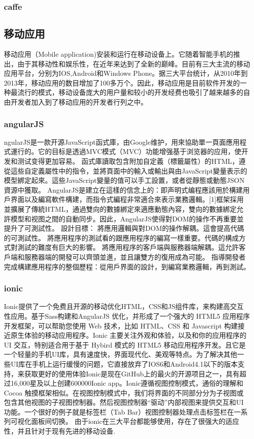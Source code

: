 \subsubsection{caffe}



\subsection{移动应用}

移动应用（Mobile application)安装和运行在移动设备上。它随着智能手机的推出，由于其移动性和娱乐性，在近年来达到了全新的巅峰。目前有三大主流的移动应用平台，分别为IOS,Android和Windows Phone。据三大平台统计，从2010年到2013年，移动应用的数目增加了100多万个。因此，移动应用是目前软件开发的一种最流行的模式，移动设备庞大的用户量和较小的开发经费也吸引了越来越多的自由开发者加入到了移动应用的开发者行列之中。
\subsubsection{angularJS}
ngularJS是一款开源JavaScript函式庫，由Google维护，用來協助單一頁面應用程式運行的。它的目标是透過MVC模式（MVC）功能增强基于浏览器的应用，使开发和测试变得更加容易。
函式庫讀取包含附加自定義（標籤屬性）的HTML，遵從這些自定義屬性中的指令，並將頁面中的輸入或輸出與由JavaScript變量表示的模型綁定起來。這些JavaScript變量的值可以手工設置，或者從靜態或動態JSON資源中獲取。
AngularJS是建立在這樣的信念上的：即声明式编程應該用於構建用戶界面以及編寫軟件構建，而指令式編程非常適合來表示業務邏輯。[1]框架採用並擴展了傳統HTML，通過雙向的數據綁定來適應動態內容，雙向的數據綁定允許模型和视图之間的自動同步。因此，AngularJS使得對DOM的操作不再重要並提升了可測試性。
設計目標：
將應用邏輯與對DOM的操作解耦。這會提高代碼的可測試性。
將應用程序的測試看的跟應用程序的編寫一樣重要。代碼的構成方式對測試的難度有巨大的影響。
將應用程序的客戶端與服務器端解耦。這允許客戶端和服務器端的開發可以齊頭並進，並且讓雙方的復用成為可能。
指導開發者完成構建應用程序的整個歷程：從用戶界面的設計，到編寫業務邏輯，再到測試。
\subsubsection{ionic}
Ionic提供了一个免费且开源的移动优化HTML，CSS和JS组件库，来构建高交互性应用。基于Sass构建和AngularJS 优化，并形成了一个强大的 HTML5 应用程序开发框架，可以帮助您使用 Web 技术，比如 HTML、CSS 和 Javascript 构建接近原生体验的移动应用程序。Ionic 主要关注外观和体验，以及和你的应用程序的 UI 交互，特别适合用于基于 Hybird 模式的 HTML5 移动应用程序开发。且它是一个轻量的手机UI库，具有速度快，界面现代化、美观等特点。为了解决其他一些UI库在手机上运行缓慢的问题，它直接放弃了IOS6和Android4.1以下的版本支持，来获取更好的使用体验Ionic是现在GitHub上的最火的开源项目之一，具有超过16,000星及以上创建600000Ionic app。Ionic遵循视图控制模式，通俗的理解和 Cocoa 触摸框架相似。在视图控制模式中，我们将界面的不同部分分为子视图或包含其他视图的子视图控制器。然后视图控制器“驱动”内部视图来提供交互和UI功能。一个很好的例子就是标签栏（Tab Bar）视图控制器处理点击标签栏在一系列可视化面板间切换。
由于ionic在三大平台都能够使用，存在了很强大的适应性，并且针对于现有先进的移动设备.


